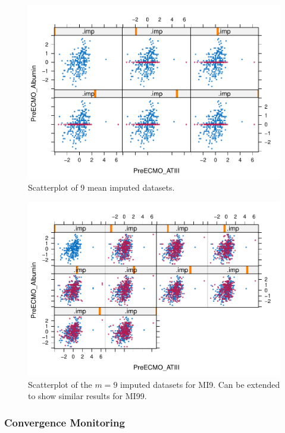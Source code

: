 \documentclass[12pt,]{article}
\begin{document}
\begin{figure}[H]

{\centering \includegraphics[width=0.75\linewidth]{figure/graphics-unnamed-chunk-14-1} 

}

\caption{\label{fig:xyplot-mean}Scatterplot of 9 mean imputed datasets.}\label{fig:unnamed-chunk-14}
\end{figure}

\begin{figure}[H]

{\centering \includegraphics[width=0.75\linewidth]{figure/graphics-unnamed-chunk-15-1} 

}

\caption{\label{fig:xyplot-pmm}Scatterplot of the $m=9$ imputed datasets for MI9.  Can be extended to show similar results for MI99.}\label{fig:unnamed-chunk-15}
\end{figure}

\subsubsection{Convergence Monitoring}\label{convergence-monitoring}
\end{document}
